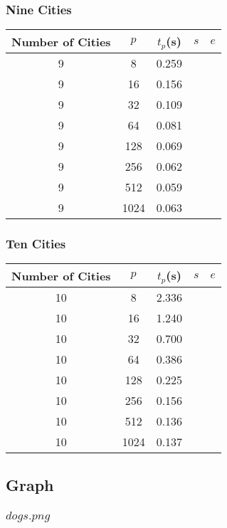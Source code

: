 \documentclass[12pt, letterpaper]{article}
\begin{document}
\subsubsection{Nine Cities}
\begin{center}
  \begin{tabular}{|c | c c c c ||}
    \hline
    Number of Cities & $p$ & $t_p$(s) & $s$ & $e$ \\
    \hline\hline
      9 & 8 &  0.259&  &  \\
      9 & 16 & 0.156 &  &  \\
      9 & 32 & 0.109 &  &  \\
      9 & 64 & 0.081 &  &  \\
      9 & 128 &0.069  &  &  \\
      9 & 256 &0.062  &  &  \\
      9 & 512 &0.059  &  &  \\
      9 & 1024 & 0.063 &  &  \\
      \hline\hline
      \hline
  \end{tabular}
\end{center}
\subsubsection{Ten Cities}
\begin{center}
  \begin{tabular}{|c | c c c c ||}
    \hline
    Number of Cities & $p$ & $t_p$(s) & $s$ & $e$ \\
    \hline\hline
      10 & 8 &  2.336&  &  \\
      10 & 16 & 1.240 &  &  \\
      10 & 32 & 0.700 &  &  \\
      10 & 64 & 0.386 &  &  \\
      10 & 128 &0.225  &  &  \\
      10 & 256 &0.156  &  &  \\
      10 & 512 &0.136  &  &  \\
      10 & 1024 & 0.137 &  &  \\
      \hline\hline
    \hline
  \end{tabular}
\end{center}

\subsection{Graph}
\subsubsection{$dogs.png$}
\end{document}
